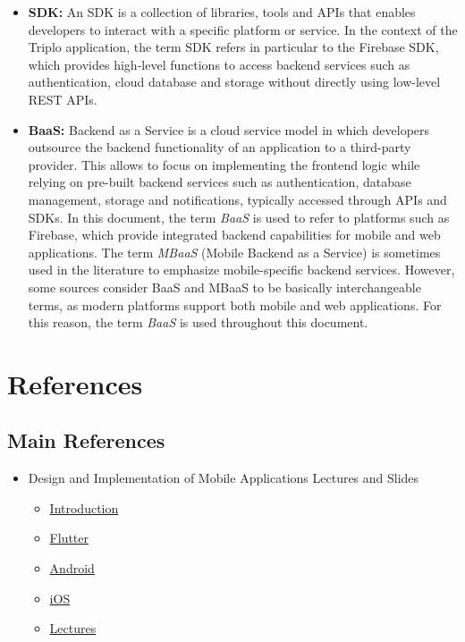 \begin{itemize}
    \item \label{SDK} \textbf{SDK:} An SDK is a collection of libraries, tools and APIs that enables developers to interact with a specific platform or service. In the context of the Triplo application, the term SDK refers in particular to the Firebase SDK, which provides high-level functions to access backend services such as authentication, cloud database and storage without directly using low-level REST APIs.
    \item \label{BaaS} \textbf{BaaS:} Backend as a Service is a cloud service model in which developers outsource the backend functionality of an application to a third-party provider. This allows to focus on implementing the frontend logic while relying on pre-built backend services such as authentication, database management, storage and notifications, typically accessed through APIs and SDKs. In this document, the term \textit{BaaS} is used to refer to platforms such as Firebase, which provide integrated backend capabilities for mobile and web applications. The term \textit{MBaaS} (Mobile Backend as a Service) is sometimes used in the literature to emphasize mobile-specific backend services. However, some sources consider BaaS and MBaaS to be basically interchangeable terms, as modern platforms support both mobile and web applications. For this reason, the term \textit{BaaS} is used throughout this document.            
\end{itemize}
\newpage
\section{References}


 

\subsection{Main References}
\begin{itemize}
    \item Design and Implementation of Mobile Applications Lectures and Slides
    \begin{itemize}
        \item \href{https://webeep.polimi.it/mod/resource/view.php?id=399280}{Introduction}
        \item \href{https://webeep.polimi.it/mod/resource/view.php?id=399287}{Flutter}
        \item \href{https://webeep.polimi.it/mod/resource/view.php?id=411641}{Android}
        \item \href{https://webeep.polimi.it/mod/resource/view.php?id=417791}{iOS}
        \item \href{https://webeep.polimi.it/mod/url/view.php?id=376880}{Lectures}
    \end{itemize}
\end{itemize}

